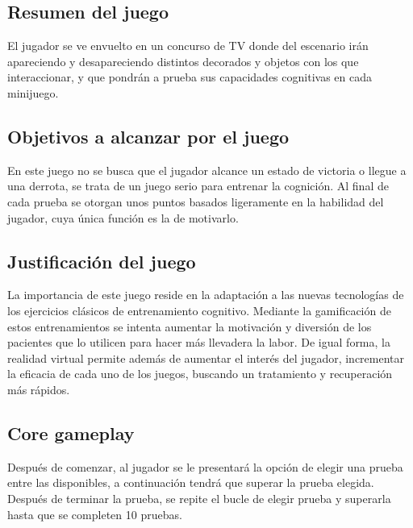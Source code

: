 \subsection{Resumen del juego}


El jugador se ve envuelto en un concurso de TV donde del escenario irán apareciendo y desapareciendo distintos decorados y objetos con los que interaccionar, y que pondrán a prueba sus capacidades cognitivas en cada minijuego. 


\subsection{Objetivos a alcanzar por el juego}

En este juego no se busca que el jugador alcance un estado de victoria o llegue a una derrota, se trata de un juego serio para entrenar la cognición. Al final de cada prueba se otorgan unos puntos basados ligeramente en la habilidad del jugador, cuya única función es la de motivarlo.




\subsection{Justificación del juego}

La importancia de este juego reside en la adaptación a las nuevas tecnologías de los ejercicios clásicos de entrenamiento cognitivo. Mediante la gamificación de estos entrenamientos se intenta aumentar la motivación y diversión de los pacientes que lo utilicen para hacer más llevadera la labor. De igual forma, la realidad virtual permite además de aumentar el interés del jugador, incrementar la eficacia de cada uno de los juegos, buscando un tratamiento y recuperación más rápidos.



\subsection{Core gameplay}
Después de comenzar, al jugador se le presentará la opción de elegir una prueba entre las disponibles, a continuación tendrá que superar la prueba elegida. Después de terminar la prueba, se repite el bucle de elegir prueba y superarla hasta que se completen 10 pruebas. 



